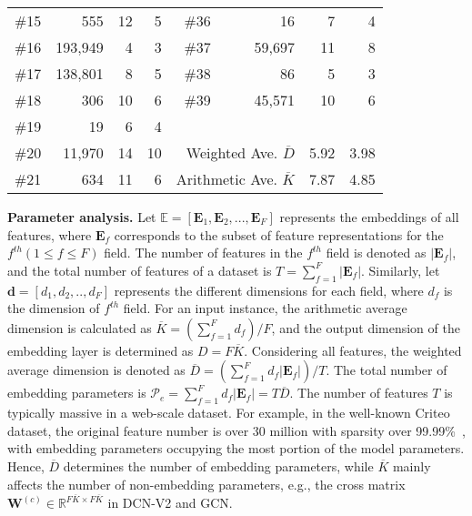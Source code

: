 \documentclass[sigconf]{acmart}
\begin{document}
\begin{table}
{\begin{tabular}{c|rrr c|rrr}
\#15 & 555 & 12 & 5    & \#36 & 16 & 7 & 4 \\
\#16 & 193,949 & 4 & 3  &  \#37 & 59,697 & 11 & 8\\
\#17 & 138,801 & 8 & 5  & \#38 & 86 & 5 & 3 \\
\#18 & 306 & 10 & 6    & \#39 & 45,571 & 10 & 6 \\
\cline{5-8}
\#19 & 19 & 6 & 4       &\multicolumn{4}{c}{}\\
\#20 & 11,970 & 14 & 10 & \multicolumn{2}{r}{Weighted Ave. $\overline{D}$} & 5.92 & 3.98 \\
\#21 & 634 & 11 & 6    &\multicolumn{2}{r}{Arithmetic Ave. $\overline{K}$} & 7.87 & 4.85 \\
\hline
\hline
\end{tabular}
}
\end{table}


\textbf{Parameter analysis.}
Let $\mathbb{E} = [\mathbf{E}_1,\mathbf{E}_2,...,\mathbf{E}_F]$ represents the embeddings of all features, where $\mathbf{E}_f$ corresponds to the subset of feature representations for the $f^{th}(1\leq f\leq F)$ field. The number of features in the $f^{th}$ field is denoted as $\lvert \mathbf{E}_{f} \rvert$, and the total number of features of a dataset is $T = \sum_{f=1}^{F} {\lvert \mathbf{E}_{f} \rvert}$. Similarly, let $\mathbf{d}=[d_1,d_2,..,d_F]$ represents the different dimensions for each field, where $d_f$ is the dimension of $f^{th}$ field. For an input instance, the arithmetic average dimension is calculated as $\overline{K} = (\sum_{f=1}^{F} d_{f}) / F$, and the output dimension of the embedding layer is determined as $D=F \overline{K}$. Considering all features, the weighted average dimension is denoted as $\overline{D} = (\sum_{f=1}^{F} d_f{\lvert \mathbf{E}_{f} \rvert}) / T $. The total number of embedding parameters is $\mathcal{P}_e = \sum_{f=1}^{F} d_f{\lvert \mathbf{E}_{f} \rvert} = T\overline{D}$. The number of features $T$ is typically massive in a web-scale dataset. For example, in the well-known Criteo dataset, the original feature number is over 30 million with sparsity over 99.99\%~\cite{song2019autoint, wang2021masknet}, with embedding parameters occupying the most portion of the model parameters. Hence, $\overline{D}$ determines the number of embedding parameters, while $\overline{K}$ mainly affects the number of non-embedding parameters, e.g., the cross matrix $\mathbf{W}^{\left( c \right)}\in\mathbb{R}^{F\overline{K} \times F\overline{K}}$ in DCN-V2 and GCN.
\end{document}
